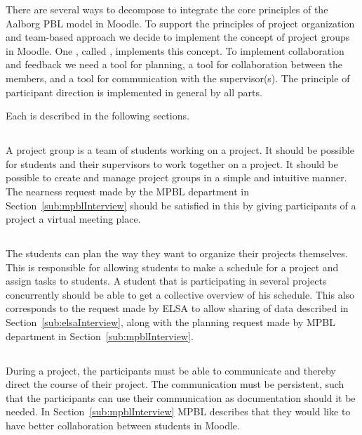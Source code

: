 There are several ways to decompose \system{} to integrate the core principles of the Aalborg PBL model in Moodle. 
To support the principles of project organization and team-based approach we decide to implement the concept of project groups in Moodle. 
One \subsystem{}, called \administrationgroup{}, implements this concept.
To implement collaboration and feedback we need a tool for planning, a tool for collaboration between the members, and a tool for communication with the supervisor(s). 
The principle of participant direction is implemented in general by all parts. 

Each \subsystem{} is described in the following sections.

\subsection{\administrationgroup{}} %
\label{sec:admgroupdecom}
A project group is a team of students working on a project.
It should be possible for students and their supervisors to work together on a project.
It should be possible to create and manage project groups in a simple and intuitive manner.
The nearness request made by the MPBL department in Section~\ref{sub:mpblInterview} should be satisfied in this \subsystem{} by giving participants of a project a virtual meeting place.

\subsection{\timelinegroup{}} %
\label{sec:tmlgroupdecom}
The students can plan the way they want to organize their projects themselves.
This \subsystem{} is responsible for allowing students to make a schedule for a project and assign tasks to students.
A student that is participating in several projects concurrently should be able to get a collective overview of his schedule.
This also corresponds to the request made by ELSA to allow sharing of data described in Section~\ref{sub:elsaInterview}, along with the planning request made by MPBL department in Section~\ref{sub:mpblInterview}.

\subsection{\blackboardgroup{}} %
During a project, the participants must be able to communicate and thereby direct the course of their project.
The communication must be persistent, such that the participants can use their communication as documentation should it be needed.
In Section~\ref{sub:mpblInterview} MPBL describes that they would like to have better collaboration between students in Moodle.

